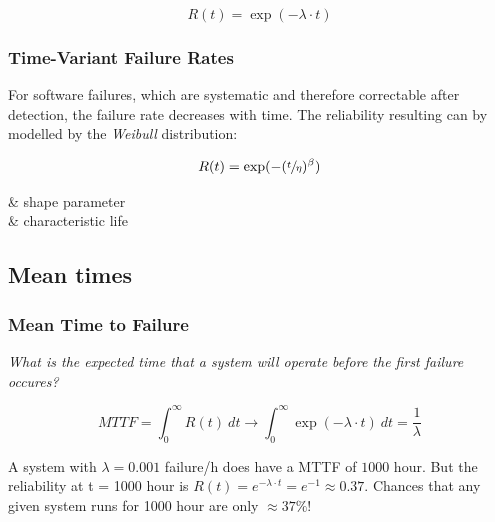 \documentclass[
  10pt,
  a4paper,
  twocolumn]{article}
\makeatletter
\newenvironment{conditions*}
  {\par\vspace{\abovedisplayskip}\noindent
   \tabularx{\columnwidth}{>{$}l<{$} @{${}:{}$} >{\raggedright\arraybackslash}X}}
  {\endtabularx\par\vspace{\belowdisplayskip}}
\makeatother
\begin{document}
\[
R(t)=\exp(-\lambda\cdot t)
\]

\subsubsection{Time-Variant Failure
Rates}\label{time-variant-failure-rates}

For software failures, which are systematic and therefore correctable
after detection, the failure rate decreases with time. The reliability
resulting can by modelled by the \emph{Weibull} distribution:

\[
R(t)=\exp(-(\sfrac{t}{\eta})^\beta)
\]

\begin{conditions*}
  \beta & shape parameter\\
  \eta & characteristic life
\end{conditions*}

\subsection{Mean times}\label{mean-times}

\subsubsection{Mean Time to Failure}\label{mean-time-to-failure}

\vspace{-2mm}{\color{Orchid}\faQuestionCircle[regular]} \emph{What is
the expected time that a system will operate before the first failure
occures?}

\[
MTTF=\int_0^\infty R(t)~dt\rightarrow\int_0^\infty \exp(-\lambda\cdot t)~dt=\frac{1}{\lambda}
\]

\begin{tcolorbox}[enhanced jigsaw, toprule=.15mm, opacityback=0, colbacktitle=quarto-callout-caution-color!10!white, breakable, colframe=quarto-callout-caution-color-frame, title=\textcolor{quarto-callout-caution-color}{\faFire}\hspace{0.5em}{Beware!}, left=2mm, arc=.35mm, toptitle=1mm, bottomrule=.15mm, rightrule=.15mm, titlerule=0mm, bottomtitle=1mm, leftrule=.75mm, opacitybacktitle=0.6, coltitle=black, colback=white]

{\small A system with $\lambda=0.001$ failure/h does have a MTTF of $1000$ hour. But the reliability at t = 1000 hour is $R(t)=e^{-\lambda\cdot t}=e^{-1}\approx 0.37$. Chances that any given system runs for 1000 hour are only $\approx37\%$!}

\end{tcolorbox}
\end{document}
